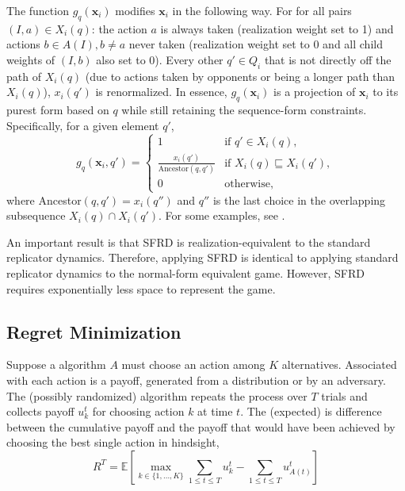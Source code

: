 \documentclass{aamas2014}
\newcommand{\bE}{\mathbb{E}}
\newcommand{\bx}{\mathbf{x}}
\newcommand{\defword}[1]{\textbf{\boldmath{#1}}}
\begin{document}
The function $g_q(\bx_i)$ modifies $\bx_i$ in the following way. 
For for all pairs $(I,a) \in X_i(q)$: the action $a$ is always taken (realization weight
set to 1) and actions $b \in A(I), b \not= a$ never taken (realization weight set to 0 and all child weights of $(I,b)$ also set to 0). 
Every other $q' \in Q_i$ that is not directly off the path of $X_i(q)$ (due to actions taken by opponents or being a longer path than $X_i(q)$),
$x_i(q')$ is renormalized. 
In essence, $g_q(\bx_i)$ is a projection of $\bx_i$ to its purest form based on $q$ 
while still retaining the sequence-form constraints. 
Specifically, for a given element $q'$, 
\begin{equation}
\label{eq:gdef}
g_q(\bx_i, q') = \left\{ \begin{array}{ll}
  1                                                   & \mbox{if $q' \in X_i(q)$}, \\
\frac{x_i(q')}{\mbox{Ancestor}(q, q')}    & \mbox{if $X_i(q) \sqsubseteq X_i(q')$}, \\  
  0                                                   & \mbox{otherwise}, \end{array} \right.
\end{equation}
where Ancestor$(q, q') = x_i(q'')$ and $q''$ is the last choice in the overlapping subsequence  
$X_i(q) \cap X_i(q')$. For some examples, see \cite{Gatti13Efficient}. 

An important result is that SFRD is realization-equivalent to the standard replicator dynamics. Therefore, applying SFRD is identical 
to applying standard replicator dynamics to the normal-form equivalent game. However, SFRD requires exponentially less space to represent
the game. 

\subsection{Regret Minimization}

Suppose a algorithm $A$ must choose an action among $K$ alternatives. 
Associated with each action is a payoff, generated from a distribution or by an adversary. 
The (possibly randomized) algorithm repeats the process over $T$ trials and collects payoff $u_k^t$ for choosing 
action $k$ at time $t$. 
The (expected) \defword{regret} is difference between the cumulative payoff and the payoff that would 
have been achieved by choosing the best single action in hindsight, 
\begin{equation}
\label{eq:regret}
R^T = \bE \left[ \max_{k \in \{1, \ldots, K\}} \sum_{1 \le t \le T} u_k^t - \sum_{1 \le t \le T} u_{A(t)}^t \right]
\end{equation}
\end{document}
